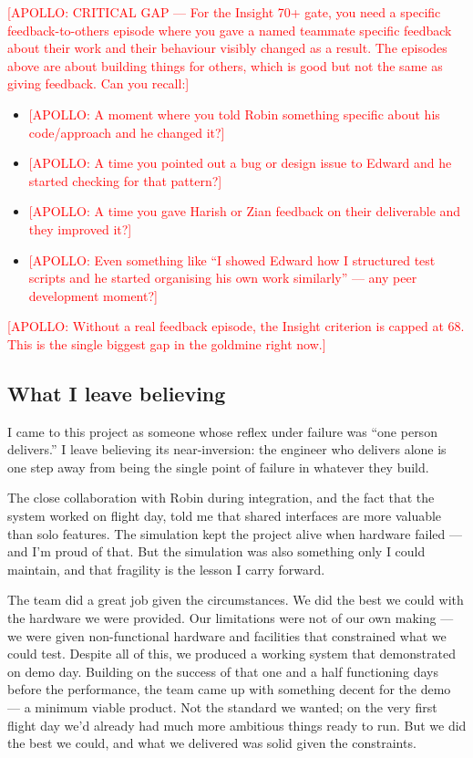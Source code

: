 \textcolor{red}{[APOLLO: CRITICAL GAP --- For the Insight 70+ gate, you need a specific feedback-to-others episode where you gave a named teammate specific feedback about their work and their behaviour visibly changed as a result. The episodes above are about building things for others, which is good but not the same as giving feedback. Can you recall:]}
\begin{itemize}[nosep]
\item \textcolor{red}{[APOLLO: A moment where you told Robin something specific about his code/approach and he changed it?]}
\item \textcolor{red}{[APOLLO: A time you pointed out a bug or design issue to Edward and he started checking for that pattern?]}
\item \textcolor{red}{[APOLLO: A time you gave Harish or Zian feedback on their deliverable and they improved it?]}
\item \textcolor{red}{[APOLLO: Even something like ``I showed Edward how I structured test scripts and he started organising his own work similarly'' --- any peer development moment?]}
\end{itemize}
\textcolor{red}{[APOLLO: Without a real feedback episode, the Insight criterion is capped at 68. This is the single biggest gap in the goldmine right now.]}


\subsection{What I leave believing}

I came to this project as someone whose reflex under failure was ``one person delivers.'' I leave believing its near-inversion: the engineer who delivers alone is one step away from being the single point of failure in whatever they build.

The close collaboration with Robin during integration, and the fact that the system worked on flight day, told me that shared interfaces are more valuable than solo features. The simulation kept the project alive when hardware failed --- and I'm proud of that. But the simulation was also something only I could maintain, and that fragility is the lesson I carry forward.

The team did a great job given the circumstances. We did the best we could with the hardware we were provided. Our limitations were not of our own making --- we were given non-functional hardware and facilities that constrained what we could test. Despite all of this, we produced a working system that demonstrated on demo day. Building on the success of that one and a half functioning days before the performance, the team came up with something decent for the demo --- a minimum viable product. Not the standard we wanted; on the very first flight day we'd already had much more ambitious things ready to run. But we did the best we could, and what we delivered was solid given the constraints.

